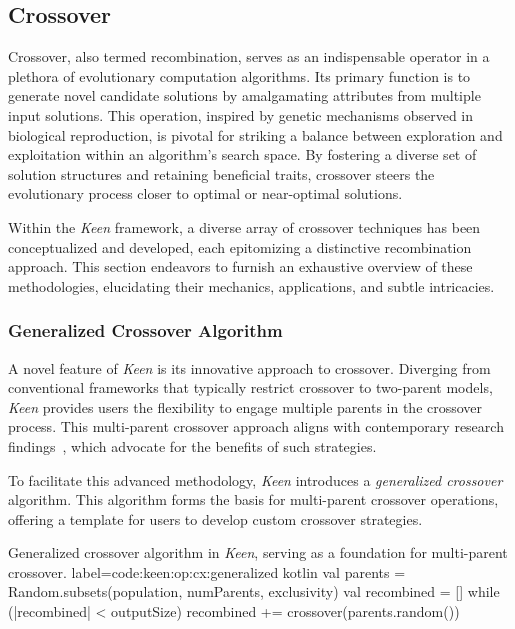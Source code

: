 \subsection{Crossover}
\label{sec:keen:op:cx}
    Crossover, also termed recombination, serves as an indispensable operator in a plethora of evolutionary computation 
    algorithms. Its primary function is to generate novel candidate solutions by amalgamating attributes from multiple 
    input solutions. This operation, inspired by genetic mechanisms observed in biological reproduction, is pivotal for 
    striking a balance between exploration and exploitation within an algorithm's search space. By fostering a diverse 
    set of solution structures and retaining beneficial traits, crossover steers the evolutionary process closer to 
    optimal or near-optimal solutions.

    Within the \textit{Keen} framework, a diverse array of crossover techniques has been conceptualized and developed, 
    each epitomizing a distinctive recombination approach. This section endeavors to furnish an exhaustive overview of 
    these methodologies, elucidating their mechanics, applications, and subtle intricacies.

    
    \subsubsection{Generalized Crossover Algorithm}
        A novel feature of \textit{Keen} is its innovative approach to crossover. Diverging from conventional 
        frameworks that typically restrict crossover to two-parent models, \textit{Keen} provides users the flexibility 
        to engage multiple parents in the crossover process. This multi-parent crossover approach aligns with 
        contemporary research findings~\autocite{tsutsuiMultiparentRecombinationSimplex1999,elsayedGANewMultiparent2011,arramNovelMultiparentOrder2019}, which advocate for the benefits of such strategies.

        To facilitate this advanced methodology, \textit{Keen} introduces a \textit{generalized crossover} algorithm. 
        This algorithm forms the basis for multi-parent crossover operations, offering a template for users to develop 
        custom crossover strategies.

        \begin{code}{
            Generalized crossover algorithm in \textit{Keen}, serving as a foundation for multi-parent crossover.
        }{
            label=code:keen:op:cx:generalized
        }{kotlin}
            val parents = Random.subsets(population, numParents, exclusivity)
            val recombined = []
            while (|recombined| < outputSize) {
                recombined += crossover(parents.random())
            }
        \end{code}

